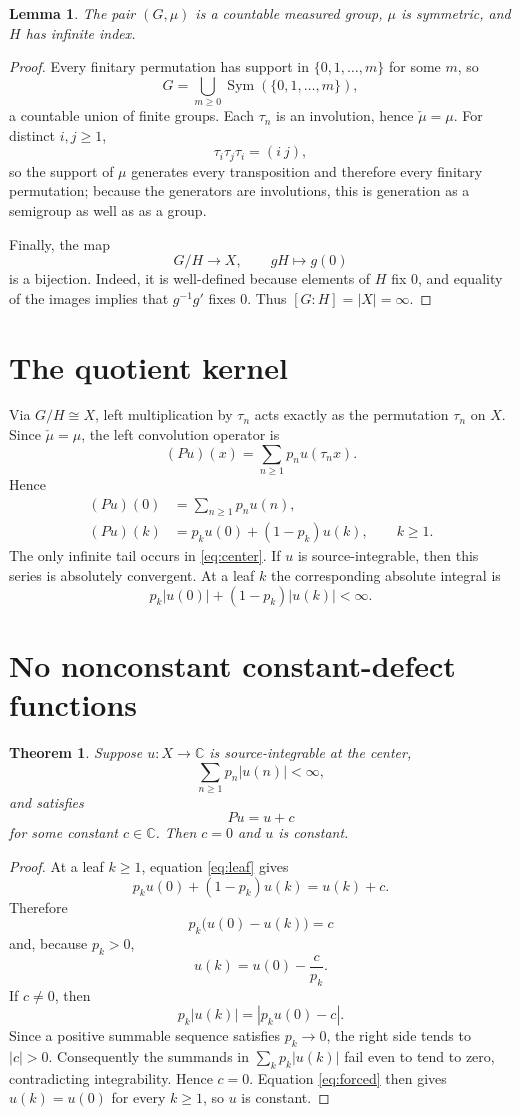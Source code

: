 \documentclass[11pt]{article}
\newtheorem{theorem}{Theorem}
\newtheorem{lemma}{Lemma}
\begin{document}
\begin{lemma}
The pair $(G,\mu)$ is a countable measured group, $\mu$ is symmetric, and $H$ has infinite index.
\end{lemma}
\begin{proof}
Every finitary permutation has support in $\{0,1,\dots,m\}$ for some $m$, so
\[
G=\bigcup_{m\ge0}\operatorname{Sym}(\{0,1,\dots,m\}),
\]
a countable union of finite groups. Each $\tau_n$ is an involution, hence $\check\mu=\mu$. For distinct $i,j\ge1$,
\[
\tau_i\tau_j\tau_i=(i\ j),
\]
so the support of $\mu$ generates every transposition and therefore every finitary permutation; because the generators are involutions, this is generation as a semigroup as well as as a group.

Finally, the map
\[
G/H\longrightarrow X,\qquad gH\longmapsto g(0)
\]
is a bijection. Indeed, it is well-defined because elements of $H$ fix $0$, and equality of the images implies that $g^{-1}g'$ fixes $0$. Thus $[G:H]=|X|=\infty$.
\end{proof}

\section{The quotient kernel}
Via $G/H\cong X$, left multiplication by $\tau_n$ acts exactly as the permutation $\tau_n$ on $X$. Since $\check\mu=\mu$, the left convolution operator is
\[
(Pu)(x)=\sum_{n\ge1}p_nu(\tau_nx).
\]
Hence
\begin{align}
(Pu)(0)&=\sum_{n\ge1}p_nu(n), \label{eq:center}\\
(Pu)(k)&=p_ku(0)+(1-p_k)u(k),\qquad k\ge1. \label{eq:leaf}
\end{align}
The only infinite tail occurs in \eqref{eq:center}. If $u$ is source-integrable, then this series is absolutely convergent. At a leaf $k$ the corresponding absolute integral is
\[
p_k|u(0)|+(1-p_k)|u(k)|<\infty.
\]

\section{No nonconstant constant-defect functions}
\begin{theorem}\label{thm:main}
Suppose $u:X\to\mathbb C$ is source-integrable at the center,
\[
\sum_{n\ge1}p_n|u(n)|<\infty,
\]
and satisfies
\[
Pu=u+c
\]
for some constant $c\in\mathbb C$. Then $c=0$ and $u$ is constant.
\end{theorem}

\begin{proof}
At a leaf $k\ge1$, equation \eqref{eq:leaf} gives
\[
p_ku(0)+(1-p_k)u(k)=u(k)+c.
\]
Therefore
\[
p_k\bigl(u(0)-u(k)\bigr)=c
\]
and, because $p_k>0$,
\begin{equation}\label{eq:forced}
u(k)=u(0)-\frac{c}{p_k}.
\end{equation}
If $c\ne0$, then
\[
p_k|u(k)|=|p_ku(0)-c|.
\]
Since a positive summable sequence satisfies $p_k\to0$, the right side tends to $|c|>0$. Consequently the summands in $\sum_kp_k|u(k)|$ fail even to tend to zero, contradicting integrability. Hence $c=0$. Equation \eqref{eq:forced} then gives $u(k)=u(0)$ for every $k\ge1$, so $u$ is constant.
\end{proof}
\end{document}

